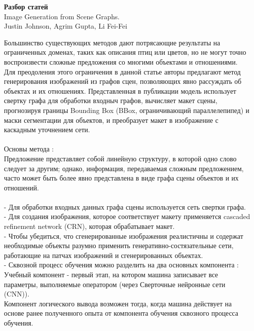 \documentclass{article}
\begin{document}
    \newpage
    \begin{center} 
    \huge \textbf{Разбор статей} \\[0.5cm]
      \huge Image Generation from Scene Graphs.\\
      Justin Johnson, Agrim Gupta, Li Fei-Fei\\ [1.3cm]
    \end{center} 
      \large Большинство существующих методов дают потрясающие результаты на ограниченных доменах, таких
как описания птиц или цветов, но не могут точно воспроизвести
сложные предложения со многими объектами и отношениями.\\
Для преодоления этого ограничения в данной статье авторы предлагают метод
генерирования изображений из графов сцен, позволяющих явно рассуждать об
объектах и их отношениях. Представленная в публикации модель использует свертку графа для
обработки входныч графов, вычисляет макет сцены, прогнозируя границы
Bounding Box (BBox, ограничивающий параллелепипед) и маски сегментации для объектов, и преобразует макет в
изображение с каскадным уточнением сети.\\ \\
Основы метода :\\
Предложение представляет собой линейную структуру, в которой одно слово следует за другим; однако,
информация, передаваемая сложным предложением, часто может быть более явно представлена в виде графа сцены
объектов и их отношений.\\ \\
 - Для обработки входных данных графа сцены используется сеть свертки графа.\\
 - Для создания изображения, которое соответствует макету применяется cascaded refinement network (CRN), которая
обрабатывает макет.\\
 - Чтобы убедиться, что сгенерированные изображения реалистичны и содержат необходимые объекты разумно применить
генеративно-состязательные сети, работающие на патчах изображений и сгенерированных объектах.\\
 - Сквозной процесс обучения можно разделить на два основных компонента :\\ 
 Учебный компонент - первый этап, на котором машина записывает все параметры, выполняемые оператором (через
 Сверточные нейронные сети (CNN)). \\
  Компонент логического вывода возможен тогда, когда машина действует на основе ранее полученного опыта от компонента обучения сквозного процесса обучения. \\
\end{document}
